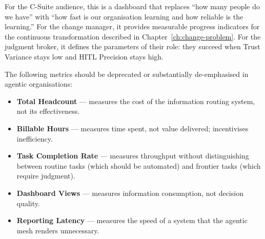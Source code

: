 For the C-Suite audience, this is a dashboard that replaces ``how many people do we have'' with ``how fast is our organisation learning and how reliable is the learning.'' For the change manager, it provides measurable progress indicators for the continuous transformation described in Chapter~\ref{ch:change-problem}. For the judgment broker, it defines the parameters of their role: they succeed when Trust Variance stays low and HITL Precision stays high.

\begin{keyinsight}[title={Abandoning Legacy KPIs}]
The following metrics should be deprecated or substantially de-emphasised in agentic organisations:
\begin{itemize}
  \item \textbf{Total Headcount} --- measures the cost of the information routing system, not its effectiveness.
  \item \textbf{Billable Hours} --- measures time spent, not value delivered; incentivises inefficiency.
  \item \textbf{Task Completion Rate} --- measures throughput without distinguishing between routine tasks (which should be automated) and frontier tasks (which require judgment).
  \item \textbf{Dashboard Views} --- measures information consumption, not decision quality.
  \item \textbf{Reporting Latency} --- measures the speed of a system that the agentic mesh renders unnecessary.
\end{itemize}
\end{keyinsight}
